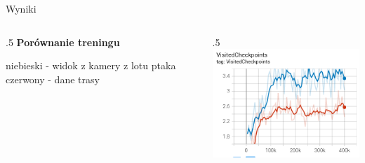 \begin{frame}{Wyniki}
	
	\begin{columns}
		\begin{column}{.5\hsize}
			\textbf{Porównanie treningu }
			\begin{itemize}
				\myitem niebieski - widok z kamery z lotu ptaka
				\myitem czerwony - dane trasy
			\end{itemize}
			\vspace{1cm}
		\end{column}

		\begin{column}{.5\hsize}
			\includegraphics[width=\linewidth]{figures/compare_res_1_checkpoints.png}
		\end{column}
	\end{columns}


\end{frame}
